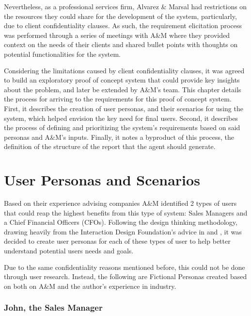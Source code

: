 \documentclass[a4paper]{report}
\begin{document}
Nevertheless, as a professional services firm, Alvarez \& Marsal had restrictions on the resources they could share for the development of the system, particularly, due to client confidentiality clauses. As such, the requirement elicitation process was performed through a series of meetings with A\&M where they provided context on the needs of their clients and shared bullet points with thoughts on potential functionalities for the system.

Considering the limitations caused by client confidentiality clauses, it was agreed to build an exploratory proof of concept system that could provide key insights about the problem, and later be extended by A\&M's team. This chapter details the process for arriving to the requirements for this proof of concept system. First, it describes the creation of user personas, and their scenarios for using the system, which helped envision the key need for final users. Second, it describes the process of defining and prioritizing the system's requirements based on said personas and A\&M's inputs. Finally, it notes a byproduct of this process, the definition of the structure of the report that the agent should generate.

\section{User Personas and Scenarios}

Based on their experience advising companies A\&M identified 2 types of users that could reap the highest benefits from this type of system: Sales Managers and a Chief Financial Officers (CFOs). Following the design thinking methodology, drawing heavily from the Interaction Design Foundation's advice in \cite{ixdf_personas_2025} and \cite{ixdf_user_scenarios_2025}, it was decided to create user personas for each of these types of user to help better understand potential users needs and goals.

Due to the same confidentiality reasons mentioned before, this could not be done through user research. Instead, the following are Fictional Personas created based on both on A\&M and the author's experience in industry.

\subsubsection{John, the Sales Manager}
\end{document}
